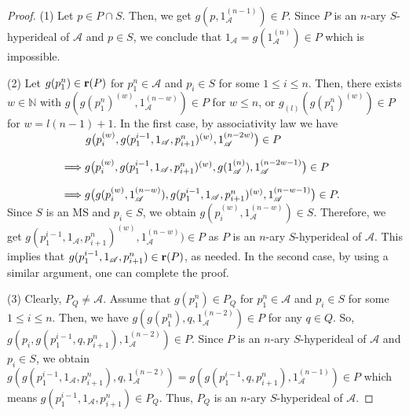\documentclass[preprint,review,10pt]{amsart}
\theoremstyle{definition}
\theoremstyle{remark}
\numberwithin{equation}{section}
\begin{document}
\begin{proof}
(1) Let $p \in P \cap S$. Then, we get $g(p,1_\mathscr{A}^{(n-1)}) \in P$. Since $P$ is an $n$-ary $S$-hyperideal of $\mathscr{A}$ and $p \in S$, we conclude that $1_\mathscr{A}=g(1_\mathscr{A}^{(n)}) \in P$ which is impossible. 

(2) Let $g(p_1^n) \in {\bf r}(P)$ for $p_1^n \in \mathscr{A}$ and $p_i \in S$ for some $1 \leq i \leq n$. Then, 
there exists $w \in \mathbb {N}$ with $g(g(p_1^n)^ {(w)} , 1_\mathscr{A}^{(n-w)} ) \in P$ for $w \leq n$, or $g_{(l)} (g(p_1^n)^ {(w)} ) \in P$ for $w = l(n-1) + 1$. In the first case,  by associativity law we have \\

$\hspace{2.5cm}g \big( p_i^{(w)},g(p_1^{i-1},1_\mathscr{A},p_{i+1}^n)^{(w)},1_\mathscr{A}^{(n-2w)} \big) \in P$

$\hspace{1.8cm}\Longrightarrow g \big( p_i^{(w)},g(p_1^{i-1},1_\mathscr{A},p_{i+1}^n)^{(w)}, g(1_\mathscr{A}^{(n)}),1_\mathscr{A}^{(n-2w-1)} \big) \in P$

$\hspace{1.8cm}\Longrightarrow g \big( g(p_i^{(w)},1_\mathscr{A}^{(n-w)}),g(p_1^{i-1},1_\mathscr{A},p_{i+1}^n)^{(w)},1_\mathscr{A}^{(n-w-1)} \big) \in P.$\\

Since $S$ is an MS and $p_i \in S$, we obtain $g(p_i^{(w)},1_\mathscr{A}^{(n-w)}) \in S$. Therefore, we get $g(p_1^{i-1},1_\mathscr{A},p_{i+1}^n)^{(w)}, 1_\mathscr{A}^{(n-w)}) \in P$ as $P$ is an $n$-ary $S$-hyperideal of $\mathscr{A}$. This implies that $g(p_1^{i-1}, 1_\mathscr{A},p_{i+1}^n) \in {\bf r}(P)$, as needed. In the second case, by using a similar argument, one can complete the proof.

(3) Clearly, $P_Q \neq \mathscr{A}$. Assume that $g(p_1^n) \in P_Q$ for $p_1^n \in \mathscr{A}$ and $p_i \in S$ for some $1 \leq i \leq n$. Then, we have $g(g(p_1^n),q,1_\mathscr{A}^{(n-2)}) \in P$ for any $q \in Q$. So, $g( p_i, g(p_1^{i-1},q,p_{i+1}^n),1_\mathscr{A}^{(n-2)}) \in P$. Since $P$ is an $n$-ary $S$-hyperideal of $\mathscr{A}$ and $p_i \in S$, we obtain $g(g(p_1^{i-1},1_\mathscr{A},p_{i+1}^n),q,1_\mathscr{A}^{(n-2)})=g(g(p_1^{i-1},q,p_{i+1}^n),1_\mathscr{A}^{(n-1)}) \in P$ which means $g(p_1^{i-1},1_\mathscr{A},p_{i+1}^n) \in P_Q$. Thus, $P_Q$ is an $n$-ary $S$-hyperideal of $\mathscr{A}$.
\end{proof}
\end{document}
